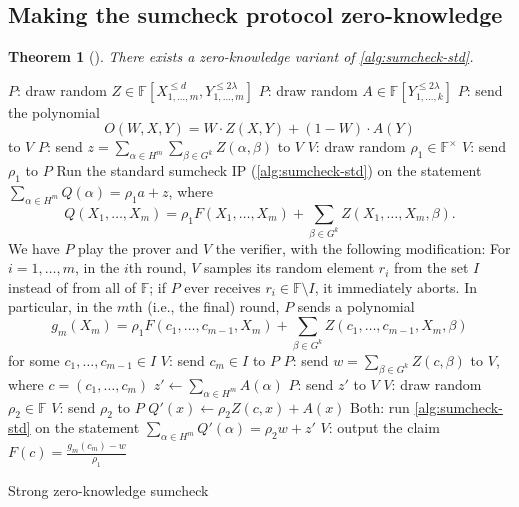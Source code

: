 \documentclass[english,12pt]{reedthesis}
\theoremstyle{plain}
\newtheorem{thm}{Theorem}[section]
\theoremstyle{definition}
\theoremstyle{remark}
\begin{document}
\subsection{Making the sumcheck protocol zero-knowledge}

\begin{thm}[{\cite[Theorem 13.3]{CFGS22}}]\label{thm:zk-sumcheck}
  There exists a zero-knowledge variant of \cref{alg:sumcheck-std}.
\end{thm}

\begin{algorithm}[htbp]
  $P$: draw random
  $Z \in \mathbb{F}[X_{1, \ldots, m}^{\le d}, Y_{1, \ldots, m}^{\le 2\lambda}]$\;
  $P$: draw random $A \in \mathbb{F}[Y_{1, \ldots, k}^{\le 2\lambda}]$\;
  $P$: send the polynomial
  \[
    O(W, X, Y) = W \cdot Z(X, Y) + (1 - W) \cdot A(Y)
  \]
  to $V$\;
  $P$: send $z = \sum_{\alpha \in H^{m}}\sum_{\beta \in G^{k}}Z(\alpha, \beta)$ to $V$\;
  $V$: draw random $\rho_{1} \in \mathbb{F}^{\times}$\;
  $V$: send $\rho_{1}$ to $P$\;
  Run the standard sumcheck IP (\cref{alg:sumcheck-std}) on the statement
  $\sum_{\alpha \in H^{m}}Q(\alpha) = \rho_{1}a + z$, where
  \[
    Q(X_{1}, \ldots, X_{m}) = \rho_{1}F(X_{1}, \ldots, X_{m}) + \sum_{\beta \in G^{k}}Z(X_{1}, \ldots, X_{m}, \beta).
  \]
  We have $P$ play the prover and $V$ the verifier, with the following
  modification: For $i = 1, \ldots, m$, in the $i$th round, $V$ samples its random
  element $r_{i}$ from the set $I$ instead of from all of $\mathbb{F}$; if $P$
  ever receives $r_{i} \in \mathbb{F} \setminus I$, it immediately aborts. In particular,
  in the $m$th (i.e., the final) round, $P$ sends a polynomial
  \[
    g_{m}(X_{m}) = \rho_{1}F(c_{1}, \ldots, c_{m-1}, X_{m}) + \sum_{\beta \in G^{k}}Z(c_{1}, \ldots, c_{m-1}, X_{m}, \beta)
  \]
  for some $c_{1}, \ldots, c_{m-1} \in I$\;
  $V$: send $c_{m} \in I$ to $P$\;
  $P$: send $w = \sum_{\beta \in G^{k}}Z(c, \beta)$ to $V$, where $c = (c_{1}, \ldots, c_{m})$\;
  $z' \leftarrow \sum_{\alpha \in H^{m}}A(\alpha)$\;
  $P$: send $z'$ to $V$\;
  $V$: draw random $\rho_{2} \in \mathbb{F}$\;
  $V$: send $\rho_{2}$ to $P$\;
  $Q'(x) \leftarrow \rho_{2}Z(c, x) + A(x)$\;
  Both: run \cref{alg:sumcheck-std} on the statement
  $\sum_{\alpha \in H^{m}}Q'(\alpha) = \rho_{2}w + z'$\;
  $V$: output the claim $F(c) = \frac{g_{m}(c_{m}) - w}{\rho_{1}}$\;
  \caption{Strong zero-knowledge sumcheck~\cite[Construction 3]{CFGS22}}\label{alg:zk-sumcheck}
\end{algorithm}
\end{document}

